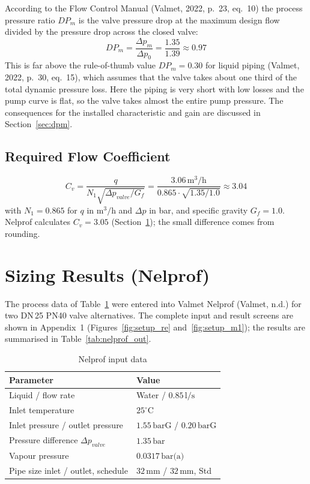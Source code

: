 \documentclass[12pt,a4paper]{article}
\begin{document}
According to the Flow Control Manual (Valmet, 2022, p.~23, eq.~10) the process pressure ratio $DP_m$ is the valve pressure drop at the maximum design flow divided by the pressure drop across the closed valve:
\begin{equation}
    DP_m = \frac{\Delta p_m}{\Delta p_0} = \frac{1.35}{1.39} \approx 0.97
\end{equation}
This is far above the rule-of-thumb value $DP_m = 0.30$ for liquid piping (Valmet, 2022, p.~30, eq.~15), which assumes that the valve takes about one third of the total dynamic pressure loss. Here the piping is very short with low losses and the pump curve is flat, so the valve takes almost the entire pump pressure. The consequences for the installed characteristic and gain are discussed in Section~\ref{sec:dpm}.

\subsection{Required Flow Coefficient}
\begin{equation}
    C_v = \frac{q}{N_1\sqrt{\Delta p_{valve}/G_f}} = \frac{3.06\,\text{m}^3/\text{h}}{0.865\cdot\sqrt{1.35/1.0}} \approx 3.04
\end{equation}
with $N_1 = 0.865$ for $q$ in $\text{m}^3/\text{h}$ and $\Delta p$ in bar, and specific gravity $G_f = 1.0$. Nelprof calculates $C_v = 3.05$ (Section~\ref{sec:nelprof}); the small difference comes from rounding.

\section{Sizing Results (Nelprof)}
\label{sec:nelprof}
The process data of Table~\ref{tab:nelprof_in} were entered into Valmet Nelprof (Valmet, n.d.) for two DN\,25 PN40 valve alternatives. The complete input and result screens are shown in Appendix~1 (Figures~\ref{fig:setup_re} and~\ref{fig:setup_m1}); the results are summarised in Table~\ref{tab:nelprof_out}.

\begin{table}[H]
\centering
\caption{Nelprof input data}
\label{tab:nelprof_in}
\small
\begin{tabular}{@{}ll@{}}
\toprule
Parameter & Value \\
\midrule
Liquid / flow rate & Water / $0.85\,\text{l/s}$ \\
Inlet temperature & $25^\circ\text{C}$ \\
Inlet pressure / outlet pressure & $1.55\,\text{barG}$ / $0.20\,\text{barG}$ \\
Pressure difference $\Delta p_{valve}$ & $1.35\,\text{bar}$ \\
Vapour pressure & $0.0317\,\text{bar(a)}$ \\
Pipe size inlet / outlet, schedule & $32\,\text{mm}$ / $32\,\text{mm}$, Std \\
\bottomrule
\end{tabular}
\end{table}
\end{document}
